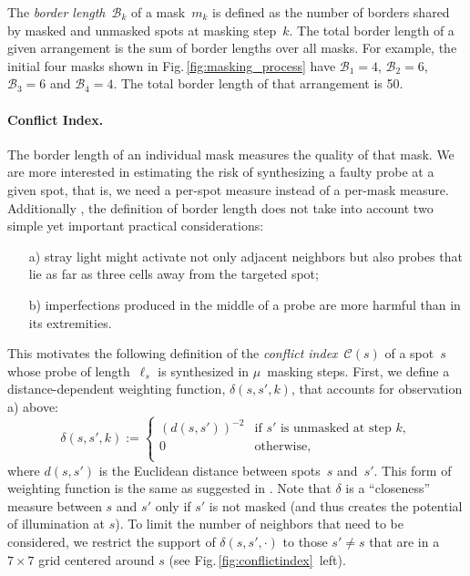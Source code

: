 \documentclass{llncs}
\begin{document}
The \emph{border length}~$\mathcal{B}_k$ of a mask~$m_{k}$ is defined as the
number of borders shared by masked and unmasked spots at masking step~$k$. The
total border length of a given arrangement is the sum of border lengths over
all masks. For example, the initial four masks shown in
Fig.\,\ref{fig:masking_process} have $\mathcal{B}_1 = 4$, $\mathcal{B}_2 = 6$,
$\mathcal{B}_3 = 6$ and $\mathcal{B}_4 = 4$.  The total border length of that
arrangement is 50.



\paragraph{Conflict Index.}
The border length of an individual mask measures the quality of that
mask. We are more interested in estimating the risk of synthesizing a faulty
probe at a given spot, that is, we need a per-spot measure
instead of a per-mask measure. Additionally \cite{KAHNG03A},
the definition of border length does not take into account two
simple yet important practical considerations:
\begin{itemize}
\item[a)] stray light might activate not only adjacent neighbors but
  also probes that lie as far as three cells away from the targeted
  spot;
\item[b)] imperfections produced in the middle of a probe are more
  harmful than in its extremities.
\end{itemize}
This motivates the following definition of the \emph{conflict
  index}~$\mathcal{C}(s)$ of a spot~$s$ whose probe of
length~$\ell_{s}$ is synthesized in $\mu$~masking steps. First, we
define a distance-dependent weighting function, $\delta(s,s',k)$, that
accounts for observation a) above:
\begin{equation}
\label{eq:dist_weight}
\delta(s,s',k) :=
        \left\{
                \begin{array}{ll}
                        (d(s,s'))^{-2} & \mbox{if $s'$ is unmasked at step $k$}, \\
                        0 & \mbox{otherwise}, \\
                \end{array}
        \right.
\end{equation}
where $d(s,s')$ is the Euclidean distance between spots~$s$ and~$s'$.
This form of weighting function is the same as suggested in
\cite{KAHNG03A}.  Note that $\delta$ is a ``closeness'' measure
between $s$ and $s'$ only if $s'$ is
not masked (and thus creates the potential of illumination at $s$). To
limit the number of neighbors that need to be considered, we
restrict the support of $\delta(s,s',\cdot)$ to those $s'\neq s$ that
are in a $7\times 7$ grid centered around $s$ (see
Fig.\,\ref{fig:conflictindex}~left).
\end{document}
